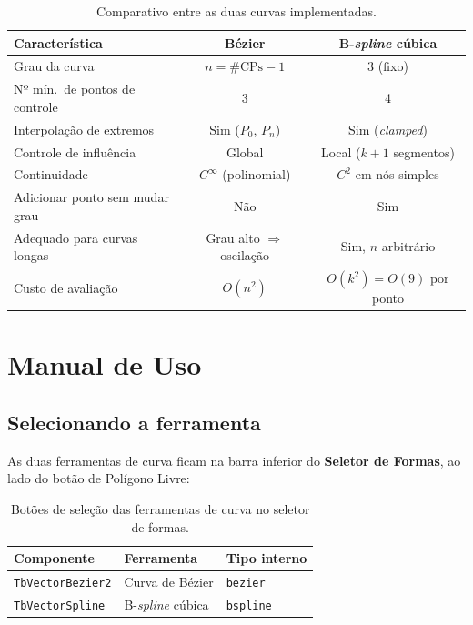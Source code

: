 \documentclass[12pt, a4paper]{article}
\theoremstyle{remark}
\newcommand{\code}[1]{\texttt{#1}}
\begin{document}
\begin{table}[H]
\centering
\renewcommand{\arraystretch}{1.35}
\begin{tabular}{lcc}
\toprule
\textbf{Característica} & \textbf{Bézier} & \textbf{B-\emph{spline} cúbica} \\
\midrule
Grau da curva                   & $n = \#\text{CPs} - 1$ & 3 (fixo) \\
Nº mín.\ de pontos de controle  & 3 & 4 \\
Interpolação de extremos        & Sim ($P_0$, $P_n$) & Sim (\emph{clamped}) \\
Controle de influência          & Global & Local ($k+1$ segmentos) \\
Continuidade                    & $C^\infty$ (polinomial) & $C^2$ em nós simples \\
Adicionar ponto sem mudar grau  & Não & Sim \\
Adequado para curvas longas     & Grau alto $\Rightarrow$ oscilação & Sim, $n$ arbitrário \\
Custo de avaliação              & $O(n^2)$ & $O(k^2) = O(9)$ por ponto \\
\bottomrule
\end{tabular}
\caption{Comparativo entre as duas curvas implementadas.}
\end{table}

\section{Manual de Uso}

\subsection{Selecionando a ferramenta}

As duas ferramentas de curva ficam na barra inferior do \textbf{Seletor de Formas},
ao lado do botão de Polígono Livre:

\begin{table}[H]
\centering
\begin{tabular}{lll}
\toprule
\textbf{Componente} & \textbf{Ferramenta} & \textbf{Tipo interno} \\
\midrule
\texttt{TbVectorBezier2} & Curva de Bézier & \code{bezier} \\
\texttt{TbVectorSpline}  & B-\emph{spline} cúbica & \code{bspline} \\
\bottomrule
\end{tabular}
\caption{Botões de seleção das ferramentas de curva no seletor de formas.}
\end{table}
\end{document}
